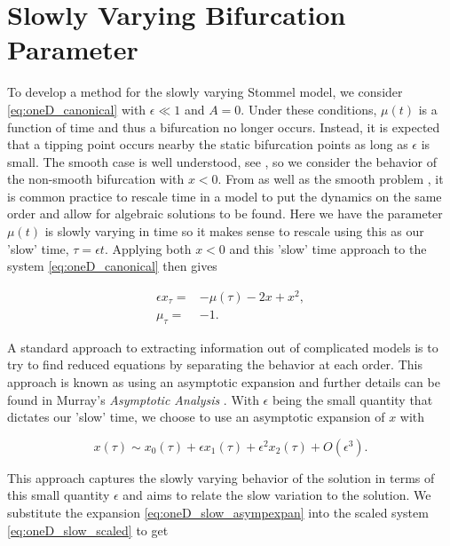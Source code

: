 \section{Slowly Varying Bifurcation Parameter}
\label{sec:oneD_slow}

To develop a method for the slowly varying Stommel model, we consider \eqref{eq:oneD_canonical} with $\epsilon\ll 1$ and $A=0$. Under these conditions, $\mu(t)$ is a function of time and thus a bifurcation no longer occurs. Instead, it is expected that a tipping point occurs nearby the static bifurcation points as long as $\epsilon$ is small. The smooth case is well understood, see \cite{zhu2015tipping}, so we consider the behavior of the non-smooth bifurcation with $x<0$. From \cite{haberman1979slowly} as well as the smooth problem \cite{zhu2015tipping}, it is common practice to rescale time in a model to put the dynamics on the same order and allow for algebraic solutions to be found. Here we have the parameter $\mu(t)$ is slowly varying in time so it makes sense to rescale using this as our 'slow' time, $\tau=\epsilon t$. Applying both $x<0$ and this 'slow' time approach to the system \eqref{eq:oneD_canonical} then gives

\begin{equation}\label{eq:oneD_slow_scaled}
\begin{aligned}
\epsilon x_\tau=&-\mu(\tau)-2x+x^2,\\
\mu_\tau=&-1.
\end{aligned}
\end{equation}

A standard approach to extracting information out of complicated models is to try to find reduced equations by separating the behavior at each order. This approach is known as using an asymptotic expansion and further details can be found in Murray's \textit{Asymptotic Analysis} \cite{murray2012asymptotic}. With $\epsilon$ being the small quantity that dictates our 'slow' time, we choose to use an asymptotic expansion of $x$ with

\begin{equation}\label{eq:oneD_slow_asympexpan}
x(\tau)\sim x_0(\tau)+\epsilon x_1(\tau)+\epsilon^2 x_2(\tau)+O(\epsilon^3).
\end{equation}

This approach captures the slowly varying behavior of the solution in terms of this small quantity $\epsilon$ and aims to relate the slow variation to the solution. We substitute the expansion \eqref{eq:oneD_slow_asympexpan} into the scaled system \eqref{eq:oneD_slow_scaled} to get


